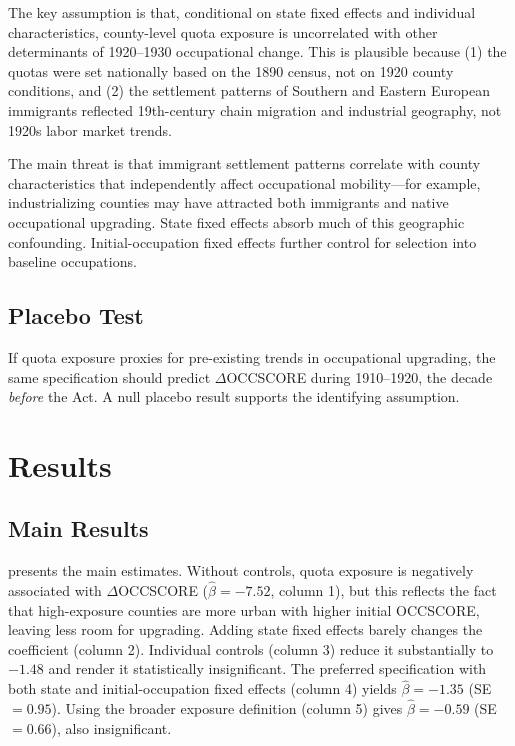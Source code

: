 \documentclass[12pt]{article}
\begin{document}
The key assumption is that, conditional on state fixed effects and individual characteristics, county-level quota exposure is uncorrelated with other determinants of 1920--1930 occupational change.  This is plausible because (1) the quotas were set nationally based on the 1890 census, not on 1920 county conditions, and (2) the settlement patterns of Southern and Eastern European immigrants reflected 19th-century chain migration and industrial geography, not 1920s labor market trends.

The main threat is that immigrant settlement patterns correlate with county characteristics that independently affect occupational mobility---for example, industrializing counties may have attracted both immigrants and native occupational upgrading.  State fixed effects absorb much of this geographic confounding.  Initial-occupation fixed effects further control for selection into baseline occupations.

\subsection{Placebo Test}

If quota exposure proxies for pre-existing trends in occupational upgrading, the same specification should predict $\Delta$OCCSCORE during 1910--1920, the decade \textit{before} the Act.  A null placebo result supports the identifying assumption.

\section{Results}
\label{sec:results}

\subsection{Main Results}



 presents the main estimates.  Without controls, quota exposure is negatively associated with $\Delta$OCCSCORE ($\hat{\beta} = -7.52$, column 1), but this reflects the fact that high-exposure counties are more urban with higher initial OCCSCORE, leaving less room for upgrading.  Adding state fixed effects barely changes the coefficient (column 2).  Individual controls (column 3) reduce it substantially to $-1.48$ and render it statistically insignificant.  The preferred specification with both state and initial-occupation fixed effects (column 4) yields $\hat{\beta} = -1.35$ (SE $= 0.95$).  Using the broader exposure definition (column 5) gives $\hat{\beta} = -0.59$ (SE $= 0.66$), also insignificant.
\end{document}
